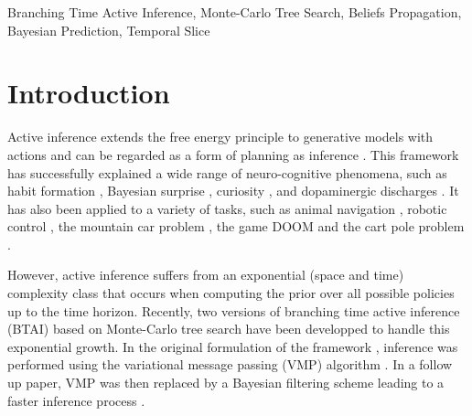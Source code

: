 \documentclass[twoside,11pt]{article}
\begin{document}
\begin{keywords}
Branching Time Active Inference, Monte-Carlo Tree Search, Beliefs Propagation, Bayesian Prediction, Temporal Slice
\end{keywords}

\newpage

\section{Introduction}

Active inference extends the free energy principle to generative models with actions \citep{FRISTON2016862,AI_TUTO,AI_VMP} and can be regarded as a form of planning as inference \citep{PAI}. This framework has successfully explained a wide range of neuro-cognitive phenomena, such as habit formation \citep{FRISTON2016862}, Bayesian surprise \citep{bayes_surprise}, curiosity \citep{curiosity}, and dopaminergic discharges \citep{dopamine}. It has also been applied to a variety of tasks, such as animal navigation \citep{DeepAIwithMCMC}, robotic control \citep{pezzato2020active,sancaktar2020endtoend}, the mountain car problem \citep{catal2020learning}, the  game DOOM \citep{CULLEN2018809} and the cart pole problem \citep{cart_pole}.

However, active inference suffers from an exponential (space and time) complexity class that occurs when computing the prior over all possible policies up to the time horizon. Recently, two versions of branching time active inference (BTAI) based on Monte-Carlo tree search \citep{MCTS} have been developped to handle this exponential growth. In the original formulation of the framework \citep{AITS_THEORY, AITS_PRACTICE}, inference was performed using the variational message passing (VMP) algorithm \citep{VMP_TUTO, AI_VMP}. In a follow up paper, VMP was then replaced by a Bayesian filtering \citep{BAYESIAN_FILTERING} scheme leading to a faster inference process \citep{BTAI_BF}.
\end{document}
